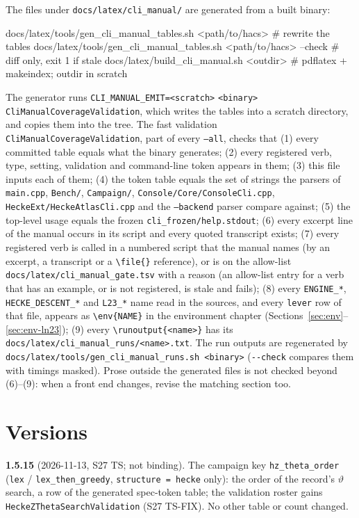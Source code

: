 \documentclass[11pt,openany]{report}
\makeatletter
\newcommand{\cli}[1]{\texttt{#1}}
\DeclareRobustCommand{\envname}[1]{\texttt{\detokenize{#1}}}
\newcommand{\env}[1]{\envname{#1}\index{#1@\envname{#1} (environment)}}
\newcommand{\file}[1]{\nolinkurl{#1}}
\newcommand{\vb}[1]{\texttt{#1}}
\newcommand{\runoutput}[1]{\par\noindent{\small\textit{Real output} \nolinkurl{docs/latex/cli_manual_runs/#1.txt}:}\par\nopagebreak
  \VerbatimInput[fontsize=\footnotesize,frame=single,framesep=2mm,rulecolor=\color{orange!60!black},breaklines=true,breakanywhere=true,obeytabs=true,tabsize=4]{cli_manual_runs/#1.txt}}
\makeatother
\begin{document}
The files under \file{docs/latex/cli_manual/} are generated from a built binary:
\begin{shell}
docs/latex/tools/gen_cli_manual_tables.sh <path/to/hacs>           # rewrite the tables
docs/latex/tools/gen_cli_manual_tables.sh <path/to/hacs> --check   # diff only, exit 1 if stale
docs/latex/build_cli_manual.sh <outdir>       # pdflatex + makeindex; outdir in scratch
\end{shell}
The generator runs \texttt{CLI\_MANUAL\_EMIT=<scratch>} \texttt{<binary>} \texttt{CliManualCoverageValidation}, which writes
the tables into a scratch directory, and copies them into the tree. The fast validation
\vb{CliManualCoverageValidation}, part of every \cli{--all}, checks that (1) every committed table equals
what the binary generates; (2) every registered verb, type, setting, validation and command-line token
appears in them; (3) this file inputs each of them; (4) the token table equals the set of strings the
parsers of \file{main.cpp}, \file{Bench/}, \file{Campaign/}, \file{Console/Core/ConsoleCli.cpp},
\file{HeckeExt/HeckeAtlasCli.cpp} and the \cli{--backend} parser compare against; (5) the top-level usage
equals the frozen \file{cli_frozen/help.stdout}; (6) every excerpt line of the manual
occurs in its script and every quoted transcript exists; (7) every registered verb is called in a numbered script that the
manual names (by an excerpt, a transcript or a \verb|\file{}| reference), or is on the allow-list \file{docs/latex/cli_manual_gate.tsv} with a
reason (an allow-list entry for a verb that has an example, or is not registered, is stale and fails); (8) every
\texttt{ENGINE\_*}, \texttt{HECKE\_DESCENT\_*} and \texttt{L23\_*} name read in the sources, and every \texttt{lever} row of that file, appears
as \verb|\env{NAME}| in the environment chapter (Sections~\ref{sec:env}--\ref{sec:env-ln23}); (9) every \verb|\runoutput{<name>}| has its
\file{docs/latex/cli_manual_runs/<name>.txt}. The run outputs are regenerated by
\verb|docs/latex/tools/gen_cli_manual_runs.sh <binary>| (\verb|--check| compares them with timings masked). Prose outside the generated
files is not checked beyond (6)--(9): when a front end changes, revise the matching section too.

\chapter{Versions}\label{app:versions}

\textbf{1.5.15} (2026-11-13, S27 TS; not binding). The campaign key \texttt{hz\_theta\_order} (\texttt{lex} /
\texttt{lex\_then\_greedy}, \texttt{structure = hecke} only): the order of the record's $\vartheta$ search, a row of the generated spec-token
table; the validation roster gains \texttt{HeckeZThetaSearchValidation} (S27 TS-FIX). No other table or count changed.
\end{document}
